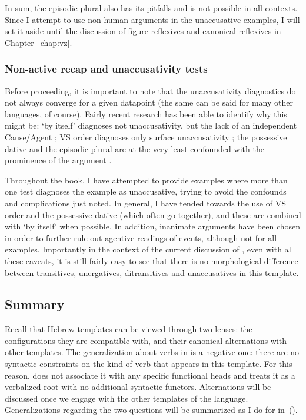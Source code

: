 In sum, the episodic plural also has its pitfalls and is not possible in all contexts. Since I attempt to use non-human arguments in the unaccusative examples, I will set it aside until the discussion of figure reflexives and canonical reflexives in Chapter~\ref{chap:vz}.


		\subsubsection{Non-active recap and unaccusativity tests}
Before proceeding, it is important to note that the unaccusativity diagnostics do not always converge for a given datapoint (the same can be said for many other languages, of course). Fairly recent research has been able to identify why this might be: `by itself' diagnoses not unaccusativity, but the lack of an independent Cause/Agent \citep{layering15}; VS order diagnoses only surface unaccusativity \citep{kastner17gjgl}; the possessive dative and the episodic plural are at the very least confounded with the prominence of the argument \citep{gafter14li,linzen14pd}.

Throughout the book, I have attempted to provide examples where more than one test diagnoses the example as unaccusative, trying to avoid the confounds and complications just noted. In general, I have tended towards the use of VS order and the possessive dative (which often go together), and these are combined with `by itself' when possible. In addition, inanimate arguments have been chosen in order to further rule out agentive readings of events, although not for all examples. Importantly in the context of the current discussion of {\tkal}, even with all these caveats, it is still fairly easy to see that there is no morphological difference between transitives, unergatives, ditransitives and unaccusatives in this template.


	\subsection{Summary}

Recall that Hebrew templates can be viewed through two lenses: the configurations they are compatible with, and their canonical alternations with other templates. The generalization about verbs in {\tkal} is a negative one: there are no syntactic constraints on the kind of verb that appears in this template. For this reason, \cite{doron03} does not associate it with any specific functional heads and \cite{borer13oup,borer15roots} treats it as a verbalized root with no additional syntactic functors. Alternations will be discussed once we engage with the other templates of the language. Generalizations regarding the two questions will be summarized as I do for {\tkal} in~(\nextx).

